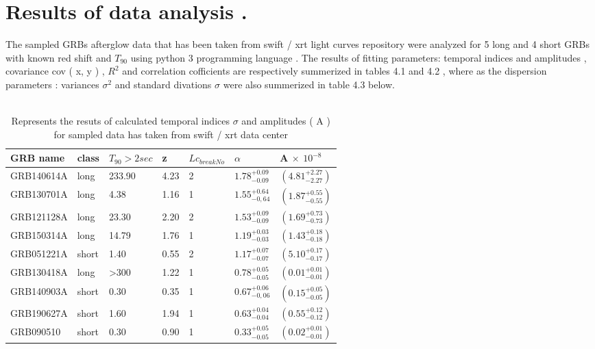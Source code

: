 \section{ Results of  data analysis .}
 The   sampled  GRBs  afterglow  data   that  has  been  taken  from  swift / xrt  light  curves repository   were  analyzed for   5  long   and  4  short  GRBs   with  known  red shift  and  $ T_{90} $  using   python 3  programming  language . The  results  of  fitting   parameters: temporal  indices  and   amplitudes  ,  covariance cov ( x, y ) , $ R^{2} $  and  correlation  cofficients  are  respectively summerized  in  tables  4.1 and   4.2 , where as  the  dispersion parameters : variances  $ \sigma^{2} $  and  standard  divations  $ \sigma $   were   also  summerized  in  table  4.3 below.\\\\ 
\begin{center}
\begin{table}
\caption{\label{tab:"Table 4.1:" } Represents  the  resuts  of   calculated  temporal indices  $ \sigma $  and  amplitudes ( A )  for  sampled  data  has taken from  swift / xrt  data center }
\begin{tabular}{|l|l|l|l|l|l|l|}
 \hline
GRB name &class& $T_{90}>2  sec $ & z & $ Lc_{break No}$ & $\alpha $& A $\times$ $ 10^{-8}$   \\ \hline
GRB140614A&long  &233.90 &4.23 & 2 &$ 1.78^{+0.09}_{-0.09}$&$(4.81^{+2.27}_{-2.27})$ \\ \hline
GRB130701A&long  &4.38 & 1.16 & 1 &$ 1.55^{+0.64}_{-0,64}$&$(1.87^{+0.55}_{-0.55})$ \\ \hline
GRB121128A&long  &23.30 &2.20 & 2 &$ 1.53^{+0.09}_{-0.09}$&$(1.69^{+0.73}_{-0.73})$ \\ \hline
GRB150314A&long  &14.79 & 1.76 & 1 &$ 1.19^{+0.03}_{-0.03}$&$(1.43^{+0.18}_{-0.18})$  \\ \hline
GRB051221A&short & 1.40 & 0.55 & 2 &$ 1.17^{+0.07}_{-0.07}$&$(5.10^{+0.17}_{-0.17})$ \\ \hline
GRB130418A&long  &>300 &1.22 & 1 &$ 0.78^{+0.05}_{-0.05}$&$(0.01^{+0.01}_{-0.01})$ \\ \hline
GRB140903A&short & 0.30 & 0.35 & 1 &$ 0.67^{+0.06}_{-0,06}$&$(0.15^{+0.05}_{-0.05})$ \\ \hline
GRB190627A&short & 1.60 & 1.94 & 1 &$ 0.63^{+0.04}_{-0.04}$&$(0.55^{+0.12}_{-0.12})$  \\ \hline
GRB090510&short  & 0.30 & 0.90 & 1 &$ 0.33^{+0.05}_{-0.05}$&$(0.02^{+0.01}_{-0.01})$  \\ \hline
\end{tabular}
\end{table}
\end{center}
